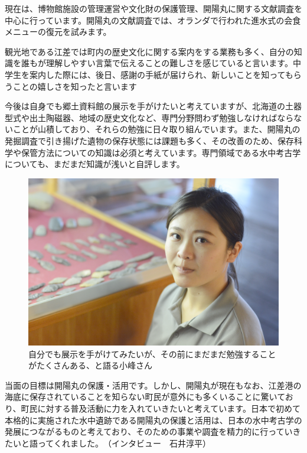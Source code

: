 \documentclass[a4j,11pt,twocolumn,openany]{jsbook}
\begin{document}
現在は、博物館施設の管理運営や文化財の保護管理、開陽丸に関する文献調査を中心に行っています。開陽丸の文献調査では、オランダで行われた進水式の会食メニューの復元を試みます。

観光地である江差では町内の歴史文化に関する案内をする業務も多く、自分の知識を誰もが理解しやすい言葉で伝えることの難しさを感じていると言います。中学生を案内した際には、後日、感謝の手紙が届けられ、新しいことを知ってもらうことの嬉しさを知ったと言います

今後は自身でも郷土資料館の展示を手がけたいと考えていますが、北海道の土器型式や出土陶磁器、地域の歴史文化など、専門分野問わず勉強しなければならないことが山積しており、それらの勉強に日々取り組んでいます。また、開陽丸の発掘調査で引き揚げた遺物の保存状態には課題も多く、その改善のため、保存科学や保管方法についての知識は必須と考えています。専門領域である水中考古学についても、まだまだ知識が浅いと自評します。

\begin{figure}[ht]
	\centering
	\includegraphics[width=\linewidth]{fig/02_Komine/Komine02.png}
	\caption{自分でも展示を手がけてみたいが、その前にまだまだ勉強することがたくさんある、と語る小峰さん}
	\label{}
	\vspace{-\baselineskip}
\end{figure}

当面の目標は開陽丸の保護・活用です。しかし、開陽丸が現在もなお、江差港の海底に保存されていることを知らない町民が意外にも多くいることに驚いており、町民に対する普及活動に力を入れていきたいと考えています。日本で初めて本格的に実施された水中遺跡である開陽丸の保護と活用は、日本の水中考古学の発展につながるものと考えており、そのための事業や調査を精力的に行っていきたいと語ってくれました。　\hspace{6zw}（インタビュー　石井淳平）
\end{document}
